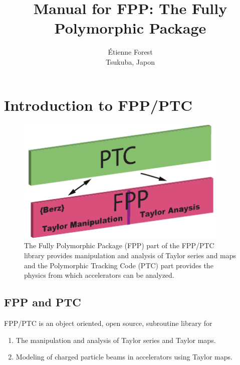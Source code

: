 \documentclass[english,12pt,article]{article} %
\title{ \protect \large Manual for FPP:   The Fully Polymorphic Package}
\author{Étienne Forest \\ Tsukuba, Japon }
\begin{document}
 


\newpage 
{\footnotesize
\tableofcontents %
}
\newpage 
\maketitle
\section{Introduction to FPP/PTC}
\label{sec:fppptc}

\begin{figure}[tb]
  \centering
  \includegraphics[width=4in]{FPP-PTC.pdf}
  \caption{The Fully Polymorphic Package (FPP) part of the FPP/PTC library provides manipulation and analysis of Taylor series and maps and the Polymorphic Tracking Code (PTC) part provides the physics from which accelerators can be analyzed.}
  \label{f:fpp-ptc}
\end{figure}

\subsection{FPP and PTC}

FPP/PTC is an object oriented, open source, subroutine library for
\begin{enumerate}[itemsep=-0.5ex, topsep=-0.4ex]
\item The manipulation and analysis of Taylor series and Taylor maps.
\item Modeling of charged particle beams in accelerators using Taylor maps.
\end{enumerate}
\end{document}
